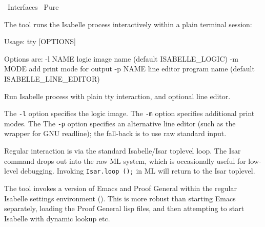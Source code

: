 %
\begin{isabellebody}%
\def\isabellecontext{Interfaces}%
%
\isadelimtheory
%
\endisadelimtheory
%
\isatagtheory
{}\isamarkupfalse%
\ Interfaces\isanewline
{}\ Pure\isanewline
{}%
\endisatagtheory
{\isafoldtheory}%
%
\isadelimtheory
%
\endisadelimtheory
%
\isamarkuptrue%
%
\isamarkuptrue%
%
\begin{isamarkuptext}%
The \hypertarget{tool.tty}{\hyperlink{tool.tty}{\mbox{}}} tool runs the Isabelle process interactively
  within a plain terminal session:
\begin{ttbox}
Usage: tty [OPTIONS]

  Options are:
    -l NAME      logic image name (default ISABELLE_LOGIC)
    -m MODE      add print mode for output
    -p NAME      line editor program name (default ISABELLE_LINE_EDITOR)

  Run Isabelle process with plain tty interaction, and optional line editor.
\end{ttbox}

  The \verb|-l| option specifies the logic image.  The
  \verb|-m| option specifies additional print modes.  The The
  \verb|-p| option specifies an alternative line editor (such
  as the \hypertarget{executable.rlwrap}{\hyperlink{executable.rlwrap}{\mbox{}}} wrapper for GNU readline); the
  fall-back is to use raw standard input.

  Regular interaction is via the standard Isabelle/Isar toplevel loop.
  The Isar command \hyperlink{command.exit}{\mbox{}} drops out into the raw ML system,
  which is occasionally useful for low-level debugging.  Invoking \verb|Isar.loop|~\verb|();| in ML will return to the Isar toplevel.%
\end{isamarkuptext}%
\isamarkuptrue%
%
\isamarkuptrue%
%
\begin{isamarkuptext}%
The \hypertarget{tool.emacs}{\hyperlink{tool.emacs}{\mbox{}}} tool invokes a version of Emacs and Proof
  General within the regular Isabelle settings environment
  ().  This is more robust than starting Emacs
  separately, loading the Proof General lisp files, and then
  attempting to start Isabelle with dynamic \hyperlink{setting.PATH}{\mbox{}} lookup
  etc.


\end{isamarkuptext}
\end{isabellebody}
